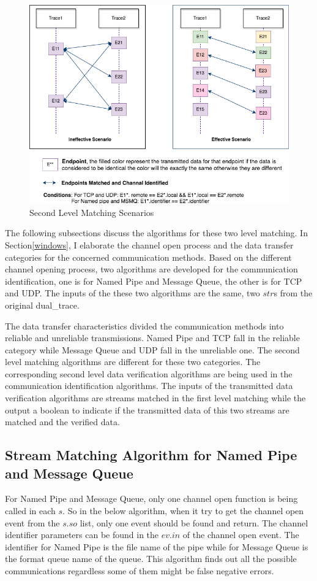 \begin{figure}[H]
\centerline{\includegraphics[scale=0.55]{Figures/secondlevelmatching}}
 \caption{Second Level Matching Scenarios}
\label{secondlevelmatching}
\end{figure}


The following subsections discuss the algorithms for these two level matching. In Section\ref{windows}, I elaborate the channel open process and the data transfer categories for the concerned communication methods. Based on the different channel opening process, two algorithms are developed for the communication identification, one is for Named Pipe and Message Queue, the other is for TCP and UDP. The inputs of the these two algorithms are the same, two $str$s from the original dual\_trace.

The data transfer characteristics divided the communication methods into reliable and unreliable transmissions. Named Pipe and TCP fall in the reliable category while Message Queue and UDP fall in the unreliable one. The second level matching algorithms are different for these two categories. The corresponding second level data verification algorithms are being used in the communication identification algorithms. The inputs of the transmitted data verification algorithms are streams matched in the first level matching while the output a boolean to indicate if the transmitted data of this two streams are matched and the verified data.

\subsection{Stream Matching Algorithm for Named Pipe and Message Queue}
For Named Pipe and Message Queue, only one channel open function is being called in each $s$. So in the below algorithm, when it try to get the channel open event from the $s.so$ list, only one event should be found and return. The channel identifier parameters can be found in the $ev.in$ of the channel open event. The identifier for Named Pipe is the file name of the pipe while for Message Queue is the format queue name of the queue. This algorithm finds out all the possible communications regardless some of them might be false negative errors. 

